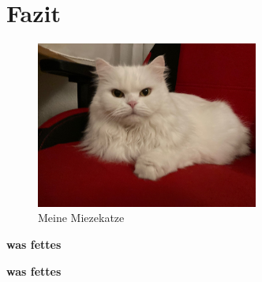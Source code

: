 \documentclass[12pt,ngerman,parskip=half]{scrartcl}
\begin{document}
\blindtext[2]

\section{Fazit}\label{sec:fazit}

\blindtext[2]


\begin{figure}[h]
\begin{center}
\includegraphics[width=0.65\textwidth,angle=90]{Bilder/Katze}
\caption{Meine Miezekatze}\label{fig:katze}
\end{center}
\end{figure}


\blindtext[2]

\textbf{was fettes}

{\bfseries was fettes}
\end{document}
